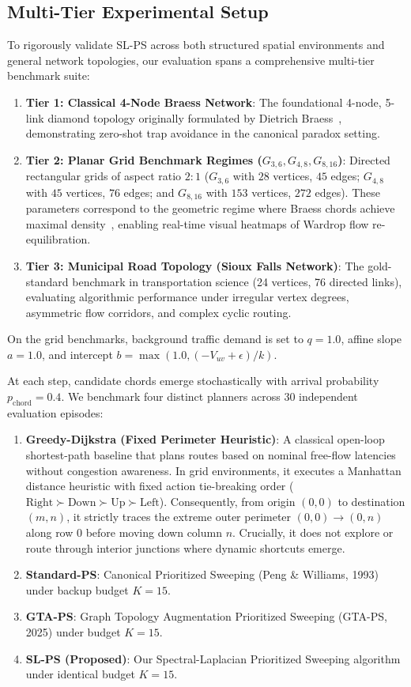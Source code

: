 \documentclass[11pt,a4paper]{article}
\begin{document}
\subsection{Multi-Tier Experimental Setup}
To rigorously validate SL-PS across both structured spatial environments and general network topologies, our evaluation spans a comprehensive multi-tier benchmark suite:
\begin{enumerate}
    \item \textbf{Tier 1: Classical 4-Node Braess Network}: The foundational 4-node, 5-link diamond topology originally formulated by Dietrich Braess~\cite{braess1968paradoxon}, demonstrating zero-shot trap avoidance in the canonical paradox setting.
    \item \textbf{Tier 2: Planar Grid Benchmark Regimes ($G_{3,6}, G_{4,8}, G_{8,16}$)}: Directed rectangular grids of aspect ratio $2:1$ ($G_{3,6}$ with $28$ vertices, $45$ edges; $G_{4,8}$ with $45$ vertices, $76$ edges; and $G_{8,16}$ with $153$ vertices, $272$ edges). These parameters correspond to the geometric regime where Braess chords achieve maximal density~\cite{lu2026braess}, enabling real-time visual heatmaps of Wardrop flow re-equilibration.
    \item \textbf{Tier 3: Municipal Road Topology (Sioux Falls Network)}: The gold-standard benchmark in transportation science (24 vertices, 76 directed links), evaluating algorithmic performance under irregular vertex degrees, asymmetric flow corridors, and complex cyclic routing.
\end{enumerate}
On the grid benchmarks, background traffic demand is set to $q = 1.0$, affine slope $a = 1.0$, and intercept $b = \max(1.0, (-V_{uv} + \epsilon) / k)$.

At each step, candidate chords emerge stochastically with arrival probability $p_{\text{chord}} = 0.4$. We benchmark four distinct planners across 30 independent evaluation episodes:
\begin{enumerate}
    \item \textbf{Greedy-Dijkstra (Fixed Perimeter Heuristic)}: A classical open-loop shortest-path baseline that plans routes based on nominal free-flow latencies without congestion awareness. In grid environments, it executes a Manhattan distance heuristic with fixed action tie-breaking order ($\text{Right} \succ \text{Down} \succ \text{Up} \succ \text{Left}$). Consequently, from origin $(0, 0)$ to destination $(m, n)$, it strictly traces the extreme outer perimeter $(0, 0) \to (0, n)$ along row 0 before moving down column $n$. Crucially, it does not explore or route through interior junctions where dynamic shortcuts emerge.
    \item \textbf{Standard-PS}: Canonical Prioritized Sweeping (Peng \& Williams, 1993) under backup budget $K = 15$.
    \item \textbf{GTA-PS}: Graph Topology Augmentation Prioritized Sweeping (GTA-PS, 2025) under budget $K = 15$.
    \item \textbf{SL-PS (Proposed)}: Our Spectral-Laplacian Prioritized Sweeping algorithm under identical budget $K = 15$.
\end{enumerate}
\end{document}
